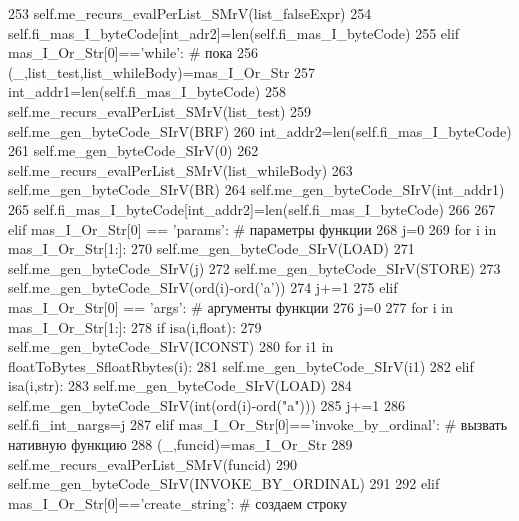 \begin{DoxyCode}
{253         self.me\_recurs\_evalPerList\_SMrV(list\_falseExpr)
254         self.fi\_mas\_I\_byteCode[int\_adr2]=len(self.fi\_mas\_I\_byteCode)
255     \textcolor{keywordflow}{elif} mas\_I\_Or\_Str[0]==\textcolor{stringliteral}{'while'}: \textcolor{comment}{# пока}
256         (\_,list\_test,list\_whileBody)=mas\_I\_Or\_Str
257         int\_addr1=len(self.fi\_mas\_I\_byteCode)
258         self.me\_recurs\_evalPerList\_SMrV(list\_test)
259         self.me\_gen\_byteCode\_SIrV(BRF)
260         int\_addr2=len(self.fi\_mas\_I\_byteCode)
261         self.me\_gen\_byteCode\_SIrV(0)
262         self.me\_recurs\_evalPerList\_SMrV(list\_whileBody)
263         self.me\_gen\_byteCode\_SIrV(BR)
264         self.me\_gen\_byteCode\_SIrV(int\_addr1)
265         self.fi\_mas\_I\_byteCode[int\_addr2]=len(self.fi\_mas\_I\_byteCode)
266         
267     \textcolor{keywordflow}{elif} mas\_I\_Or\_Str[0] == \textcolor{stringliteral}{'params'}: \textcolor{comment}{# параметры функции}
268         j=0
269         \textcolor{keywordflow}{for} i \textcolor{keywordflow}{in} mas\_I\_Or\_Str[1:]:
270             self.me\_gen\_byteCode\_SIrV(LOAD)
271             self.me\_gen\_byteCode\_SIrV(j)
272             self.me\_gen\_byteCode\_SIrV(STORE)
273             self.me\_gen\_byteCode\_SIrV(ord(i)-ord(\textcolor{stringliteral}{'a'}))
274             j+=1
275     \textcolor{keywordflow}{elif} mas\_I\_Or\_Str[0] == \textcolor{stringliteral}{'args'}: \textcolor{comment}{# аргументы функции}
276         j=0
277         \textcolor{keywordflow}{for} i \textcolor{keywordflow}{in} mas\_I\_Or\_Str[1:]:
278             \textcolor{keywordflow}{if}  isa(i,float): 
279                 self.me\_gen\_byteCode\_SIrV(ICONST)
280                 \textcolor{keywordflow}{for} i1 \textcolor{keywordflow}{in} floatToBytes\_SfloatRbytes(i):
281                     self.me\_gen\_byteCode\_SIrV(i1)                
282             \textcolor{keywordflow}{elif} isa(i,str):
283                 self.me\_gen\_byteCode\_SIrV(LOAD)
284                 self.me\_gen\_byteCode\_SIrV(int(ord(i)-ord(\textcolor{stringliteral}{"a"})))
285             j+=1
286         self.fi\_int\_nargs=j
287     \textcolor{keywordflow}{elif} mas\_I\_Or\_Str[0]==\textcolor{stringliteral}{'invoke\_by\_ordinal'}: \textcolor{comment}{# вызвать нативную функцию}
288         (\_,funcid)=mas\_I\_Or\_Str
289         self.me\_recurs\_evalPerList\_SMrV(funcid)
290         self.me\_gen\_byteCode\_SIrV(INVOKE\_BY\_ORDINAL)
291         
292     \textcolor{keywordflow}{elif} mas\_I\_Or\_Str[0]==\textcolor{stringliteral}{'create\_string'}: \textcolor{comment}{# создаем строку }
}
\end{DoxyCode}
